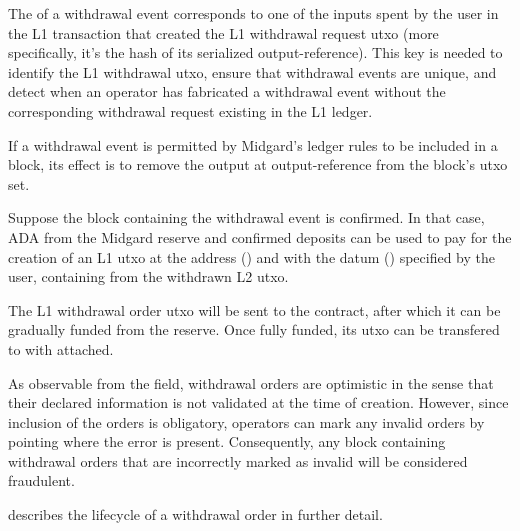 \documentclass[../midgard.tex]{subfiles}
\begin{document}
The  of a withdrawal event corresponds to one of the inputs spent by the user in the L1 transaction that created the L1 withdrawal request utxo (more specifically, it's the hash of its serialized output-reference).
This key is needed to identify the L1 withdrawal utxo, ensure that withdrawal events are unique, and detect when an operator has fabricated a withdrawal event without the corresponding withdrawal request existing in the L1 ledger.

If a withdrawal event is permitted by Midgard's ledger rules to be included in a block, its effect is to remove the output at output-reference  from the block's utxo set.

Suppose the block containing the withdrawal event is confirmed.
In that case, ADA from the Midgard reserve and confirmed deposits can be used to pay for the creation of an L1 utxo at the address () and with the datum () specified by the user, containing  from the withdrawn L2 utxo.

The L1 withdrawal order utxo will be sent to the  contract, after which it can be gradually funded from the reserve. Once fully funded, its utxo can be transfered to  with  attached.

As observable from the  field, withdrawal orders are optimistic in the sense that their declared information is not validated at the time of creation.
However, since inclusion of the orders is obligatory, operators can mark any invalid orders by pointing where the error is present.
Consequently, any block containing withdrawal orders that are incorrectly marked as invalid will be considered fraudulent.

 describes the lifecycle of a withdrawal order in further detail.
\end{document}

